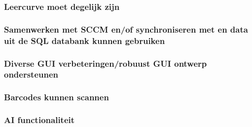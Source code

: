 \subsubsection{Leercurve moet degelijk zijn}



\subsubsection{Samenwerken met SCCM en/of synchroniseren met en data uit de SQL databank kunnen gebruiken}
\subsubsection{Diverse GUI verbeteringen/robuust GUI ontwerp ondersteunen}
\subsubsection{Barcodes kunnen scannen}
\subsubsection{AI functionaliteit}
